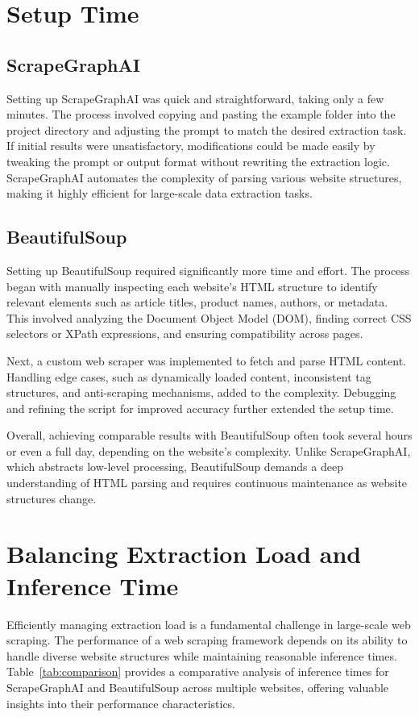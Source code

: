\section{Setup Time}

\subsection{ScrapeGraphAI}
Setting up ScrapeGraphAI was quick and straightforward, taking only a few minutes. The process involved copying and pasting the example folder into the project directory and adjusting the prompt to match the desired extraction task. If initial results were unsatisfactory, modifications could be made easily by tweaking the prompt or output format without rewriting the extraction logic. ScrapeGraphAI automates the complexity of parsing various website structures, making it highly efficient for large-scale data extraction tasks.

\subsection{BeautifulSoup}
Setting up BeautifulSoup required significantly more time and effort. The process began with manually inspecting each website's HTML structure to identify relevant elements such as article titles, product names, authors, or metadata. This involved analyzing the Document Object Model (DOM), finding correct CSS selectors or XPath expressions, and ensuring compatibility across pages.

Next, a custom web scraper was implemented to fetch and parse HTML content. Handling edge cases, such as dynamically loaded content, inconsistent tag structures, and anti-scraping mechanisms, added to the complexity. Debugging and refining the script for improved accuracy further extended the setup time.

Overall, achieving comparable results with BeautifulSoup often took several hours or even a full day, depending on the website's complexity. Unlike ScrapeGraphAI, which abstracts low-level processing, BeautifulSoup demands a deep understanding of HTML parsing and requires continuous maintenance as website structures change.

\section{Balancing Extraction Load and Inference Time}

Efficiently managing extraction load is a fundamental challenge in large-scale web scraping. The performance of a web scraping framework depends on its ability to handle diverse website structures while maintaining reasonable inference times. Table~\ref{tab:comparison} provides a comparative analysis of inference times for ScrapeGraphAI and BeautifulSoup across multiple websites, offering valuable insights into their performance characteristics.

